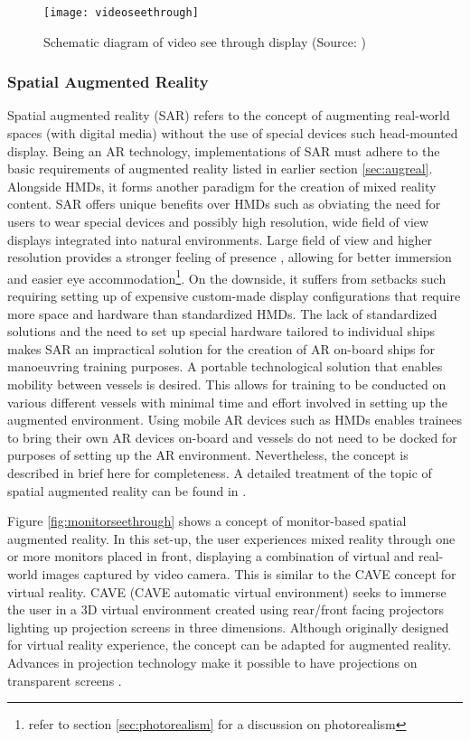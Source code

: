 \begin{figure}
	\centering
	\texttt{[image: videoseethrough]}
	\caption{Schematic diagram of video see through display (Source: \cite{azuma1997survey})}
	\label{fig:videoseethrough}
\end{figure}

\subsubsection{Spatial Augmented Reality}

Spatial augmented reality (SAR) refers to the concept of augmenting real-world spaces (with digital media) without the use of special devices such head-mounted display. Being an AR technology, implementations of SAR must adhere to the basic requirements of augmented reality listed in earlier section \ref{sec:augreal}. Alongside HMDs, it forms another paradigm for the creation of mixed reality content. SAR offers unique benefits over HMDs such as obviating the need for users to wear special devices and possibly high resolution, wide field of view displays integrated into natural environments. Large field of view and higher resolution provides a stronger feeling of presence \parencite{lantz1996future}, allowing for better immersion and easier eye accommodation\footnote{refer to section \ref{sec:photorealism} for a discussion on photorealism}. On the downside, it suffers from setbacks such requiring setting up of expensive custom-made display configurations that require more space and hardware than standardized HMDs.
The lack of standardized solutions and the need to set up special hardware tailored to individual ships makes SAR an impractical solution for the creation of AR on-board ships for manoeuvring training purposes. A portable technological solution that enables mobility between vessels is desired. This allows for training to be conducted on various different vessels with minimal time and effort involved in setting up the augmented environment. Using mobile AR devices such as HMDs enables trainees to bring their own AR devices on-board and vessels do not need to be docked for purposes of setting up the AR environment. Nevertheless, the concept is described in brief here for completeness. A detailed treatment of the topic of spatial augmented reality can be found in \cite{bimber2005spatial}.

Figure \ref{fig:monitorseethrough} shows a concept of monitor-based spatial augmented reality. In this set-up, the user experiences mixed reality through one or more monitors placed in front, displaying a combination of virtual and real-world images captured by video camera. This is similar to the CAVE \parencite{cruz1993surround} concept for virtual reality. CAVE (CAVE automatic virtual environment) seeks to immerse the user in a 3D virtual environment created using rear/front facing projectors lighting up projection screens in three dimensions. Although originally designed for virtual reality experience, the concept can be adapted for augmented reality. Advances in projection technology make it possible to have projections on transparent screens \parencite{peterson2006human}. 

